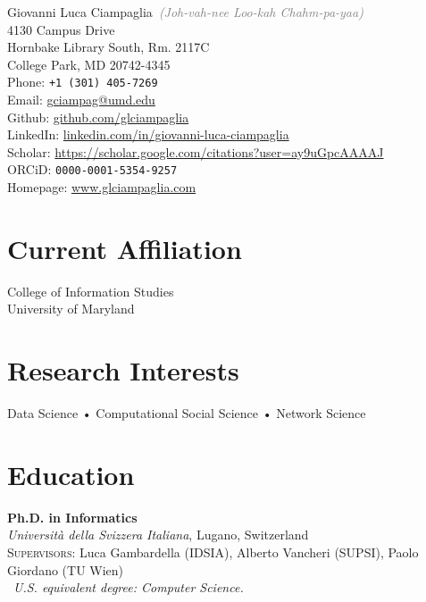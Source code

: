 \documentclass[10pt, letterpaper]{article}
\newcommand{\years}[1]{\marginnote{\small #1}}
\begin{document}
{\LARGE Giovanni Luca Ciampaglia}~\textcolor{gray}{\emph{(Joh-vah-nee Loo-kah Chahm-pa-yaa)}}\\[.75cm]
4130 Campus Drive\\
Hornbake Library South, Rm. 2117C\\
College Park, MD 20742-4345\\
Phone: \texttt{+1 (301) 405-7269}\\[.2cm]
Email: \href{mailto:gciampag3@umd.edu}{gciampag@umd.edu}\\
Github: \href{http://github.com/glciampaglia}{github.com/glciampaglia}\\ 
LinkedIn: \href{http://linkedin.com/in/giovanni-luca-ciampaglia}{linkedin.com/in/giovanni-luca-ciampaglia}\\
Scholar: \href{https://scholar.google.com/citations?user=ay9uGpcAAAAJ}{https://scholar.google.com/citations?user=ay9uGpcAAAAJ}\\
ORCiD: \texttt{0000-0001-5354-9257}\\
Homepage: \href{http://www.glciampaglia.com/}{www.glciampaglia.com}\\

\section*{Current Affiliation}

College of Information Studies\\
University of Maryland

\section*{Research Interests}
Data Science • Computational Social Science • Network Science


\section*{Education}
\noindent

\years{2012}\textbf{Ph.D. in Informatics\textsuperscript{\textasteriskcentered}}\\
%
\textsl{Università della Svizzera Italiana}, Lugano, Switzerland\\
%
\textsc{Supervisors}: Luca Gambardella (IDSIA), Alberto Vancheri (SUPSI), Paolo
Giordano (TU Wien)\\
\textasteriskcentered~\emph{\footnotesize U.S. equivalent degree: Computer Science.}\\
\end{document}
